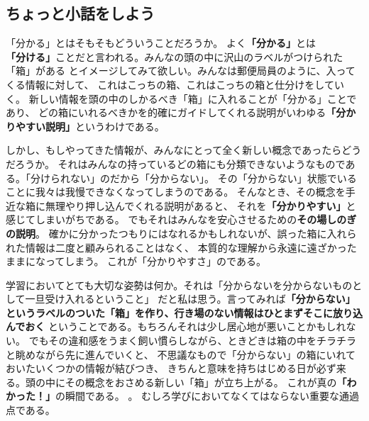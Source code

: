   \subsection{\textbf{ちょっと小話をしよう}}
  「分かる」とはそもそもどういうことだろうか。
  よく\textbf{「分かる」}とは\textbf{「分ける」}ことだと言われる。みんなの頭の中に沢山のラベルがつけられた「箱」がある
  とイメージしてみて欲しい。みんなは郵便局員のように、入ってくる情報に対して、
  これはこっちの箱、これはこっちの箱と仕分けをしていく。
  新しい情報を頭の中のしかるべき「箱」に入れることが「分かる」ことであり、
  どの箱にいれるべきかを的確にガイドしてくれる説明がいわゆる\textbf{「分かりやすい説明」}というわけである。

\medskip
\medskip
  しかし、もしやってきた情報が、みんなにとって全く新しい概念であったらどうだろうか。
  それはみんなの持っているどの箱にも分類できないようなものである。「分けられない」のだから「分からない」。
  その「分からない」状態でいることに我々は我慢できなくなってしまうのである。
  そんなとき、その概念を手近な箱に無理やり押し込んでくれる説明があると、
  それを\textbf{「分かりやすい」}と感じてしまいがちである。
  でもそれはみんなを安心させるための\textbf{その場しのぎの説明}。
  確かに分かったつもりにはなれるかもしれないが、誤った箱に入れられた情報は二度と顧みられることはなく、
  本質的な理解から永遠に遠ざかったままになってしまう。
  これが「分かりやすさ」のである。

\medskip
\medskip
  学習においてとても大切な姿勢は何か。それは「分からないを分からないものとして一旦受け入れるということ」
  だと私は思う。言ってみれば\textbf{「分からない」というラベルのついた「箱」を作り、行き場のない情報はひとまずそこに放り込んでおく}
  ということである。もちろんそれは少し居心地が悪いことかもしれない。
  でもその違和感をうまく飼い慣らしながら、ときどきは箱の中をチラチラと眺めながら先に進んでいくと、
  不思議なもので「分からない」の箱にいれておいたいくつかの情報が結びつき、
  きちんと意味を持ちはじめる日が必ず来る。頭の中にその概念をおさめる新しい「箱」が立ち上がる。
  これが真の\textbf{「わかった！」}の瞬間である。
  。
  むしろ学びにおいてなくてはならない重要な通過点である。

\medskip
\medskip

